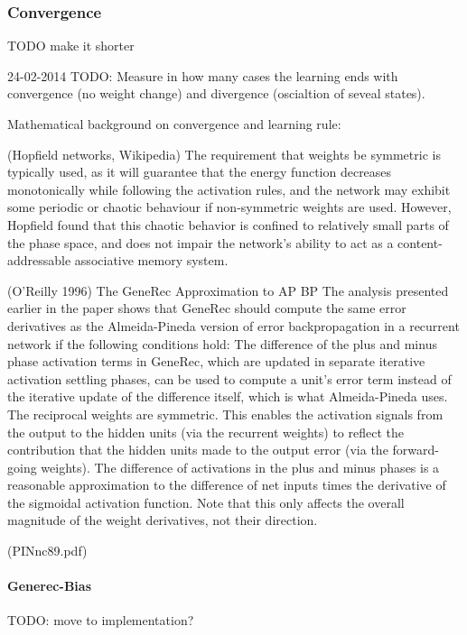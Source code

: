 \subsubsection{Convergence} 
TODO make it shorter 

24-02-2014
TODO: Measure in how many cases the learning ends with convergence (no weight change) and divergence (oscialtion of seveal states). 

 Mathematical background on convergence and learning rule: 

(Hopfield networks, Wikipedia) The requirement that weights be symmetric is typically used, as it will guarantee that the energy function decreases monotonically while following the activation rules, and the network may exhibit some periodic or chaotic behaviour if non-symmetric weights are used. However, Hopfield found that this chaotic behavior is confined to relatively small parts of the phase space, and does not impair the network's ability to act as a content-addressable associative memory system.

(O'Reilly 1996) The GeneRec Approximation to AP BP
The analysis presented earlier in the paper shows that GeneRec should compute the same error derivatives as the Almeida-Pineda version of error backpropagation in a recurrent network if the following conditions hold:
  The difference of the plus and minus phase activation terms in GeneRec, which are updated in separate iterative activation settling phases, can be used to compute a unit’s error term instead of the iterative update of the difference itself, which is what Almeida-Pineda uses.
  The reciprocal weights are symmetric. This enables the activation signals from the output to the hidden units (via the recurrent weights) to reflect the contribution that the hidden units made to the output error (via the forward-going weights).
  The difference of activations in the plus and minus phases is a reasonable approximation to the difference of net inputs times the derivative of the sigmoidal activation function. Note that this only affects the overall magnitude of the weight derivatives, not their direction.
  
(PINnc89.pdf) 

\paragraph{Generec-Bias} 
TODO: move to implementation? 

